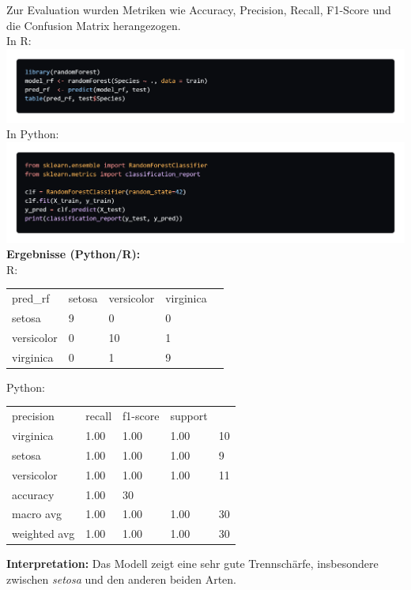 \documentclass[a4paper,12pt]{scrartcl}
\begin{document}
Zur Evaluation wurden Metriken wie Accuracy, Precision, Recall, F1-Score und die Confusion Matrix herangezogen.\\
In R:\\
\includegraphics[scale=0.25]{iris_2_R.png}\\
In Python:\\
\includegraphics[scale=0.25]{iris_2_py.png}\\
\newline
\textbf{Ergebnisse (Python/R):}\\
R:
\begin{table}[!h]
\begin{tabular}{lllll}
pred\_rf   & setosa & versicolor & virginica &  \\
setosa     & 9      & 0          & 0         &  \\
versicolor & 0      & 10         & 1         &  \\
virginica  & 0      & 1          & 9         & 
\end{tabular}
\end{table}

Python:
\begin{table}[!h]
\begin{tabular}{lllll}
precision    & recall & f1-score & support &    \\
virginica    & 1.00   & 1.00     & 1.00    & 10 \\
setosa       & 1.00   & 1.00     & 1.00    & 9  \\
versicolor   & 1.00   & 1.00     & 1.00    & 11 \\
accuracy     & 1.00   & 30       &         &    \\
macro avg    & 1.00   & 1.00     & 1.00    & 30 \\
weighted avg & 1.00   & 1.00     & 1.00    & 30
\end{tabular}
\end{table}
\newline
\textbf{Interpretation:} Das Modell zeigt eine sehr gute Trennschärfe, insbesondere zwischen \textit{setosa} und den anderen beiden Arten.
\end{document}
